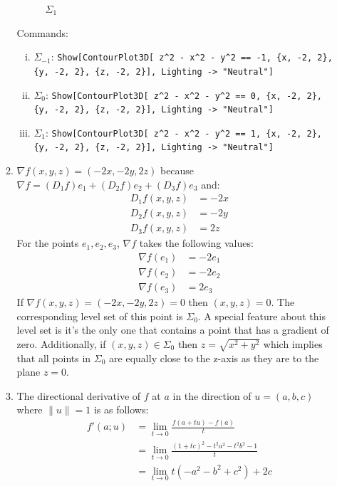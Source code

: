 \documentclass[letterpaper,10pt]{article}
\begin{document}
\begin{enumerate}
\begin{enumerate}
\begin{figure}[ht]
\begin{minipage}[b]{0.30\linewidth}
				\caption{$\Sigma_1$}
				\label{fig:figure2}
			\end{minipage}
		\end{figure}

		Commands:
		\begin{enumerate}[i.]
			\item $\Sigma_{-1}$:
			{\tt Show[ContourPlot3D[
  z\verb|^|2 - x\verb|^|2 - y\verb|^|2 == -1, \{x, -2, 2\}, \{y, -2, 2\}, \{z, -2, 2\}], 
 Lighting -> "Neutral"] }
			\item $\Sigma_{0}$:
			{\tt Show[ContourPlot3D[
  z\verb|^|2 - x\verb|^|2 - y\verb|^|2 == 0, \{x, -2, 2\}, \{y, -2, 2\}, \{z, -2, 2\}], 
 Lighting -> "Neutral"] }
			\item $\Sigma_{1}$:
			{\tt Show[ContourPlot3D[
  z\verb|^|2 - x\verb|^|2 - y\verb|^|2 == 1, \{x, -2, 2\}, \{y, -2, 2\}, \{z, -2, 2\}], 
 Lighting -> "Neutral"] }
		\end{enumerate}
		\item $\nabla f (x,y,z) = (-2x, -2y, 2z)$ because $\nabla f = (D_1 f)e_1 + (D_2 f)e_2 + (D_3 f)e_3$ and: 
		\begin{align*}
			D_1 f (x,y,z) & = -2x \\
			D_2 f (x,y,z) & = -2y \\ 
			D_3 f (x,y,z) & = 2z
		\end{align*}
		For the points $e_1, e_2, e_3$, $\nabla f$ takes the following values:
		\begin{align*}
			\nabla f (e_1) & = -2 e_1 \\
			\nabla f (e_2) & = -2 e_2 \\ 
			\nabla f (e_3) & = 2 e_3
		\end{align*}
		If $\nabla f(x, y, z) = (-2x, -2y, 2z) = 0$ then $(x, y, z) = 0$. The corresponding level set of this point is $\Sigma_0$. A special feature about this level set is it's the only one that contains a point that has a gradient of zero.
		Additionally, if $(x, y, z) \in \Sigma_0$ then $z = \sqrt{x^2 + y^2}$ which implies that all points in $\Sigma_0$ are equally close to the z-axis as they are to the plane $z = 0$.
		\item The directional derivative of $f$ at $a$ in the direction of $u = (a,b,c)$ where $\| u \| = 1$ is as follows:
		\begin{align*}
			f'(a;u) & = \lim_{t \to 0} \frac{f(a+tu) - f(a)}{t} \\
			 & = \lim_{t \to 0} \frac{(1+tc)^2 - t^2a^2 - t^2b^2 - 1}{t} \\
			 & = \lim_{t \to 0} t(-a^2 - b^2 + c^2) + 2c \\

\end{align*}
\end{enumerate}
\end{enumerate}
\end{document}

